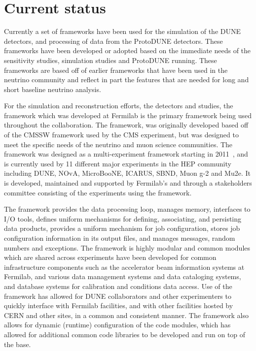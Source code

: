 \documentclass[../main-v1.tex]{subfiles}
\begin{document}
\section{Current status}\label{sec:framework:status}

Currently a set of frameworks have been used for the simulation of the DUNE detectors, and processing of data from the ProtoDUNE detectors.  These frameworks have been developed or adopted based on the immediate needs of the sensitivity studies, simulation studies and ProtoDUNE running.  These frameworks are based off of earlier frameworks that have been used in the neutrino community and reflect in part the features that are needed for long and short baseline neutrino analysis.

For the  simulation and reconstruction efforts, the  detectors and  studies, the  framework which was developed at Fermilab is the primary framework being used throughout the collaboration.  The  framework, was originally developed based off of the CMSSW framework used by the CMS experiment, but was designed to meet the specific needs of the neutrino and muon science communities.  The  framework was designed as a multi-experiment framework starting in 2011~\cite{Green:2012gv}, and is currently used by 11 different major experiments in the HEP community including DUNE, NOvA, MicroBooNE, ICARUS, SBND, Muon g-2 and Mu2e.  It is developed, maintained and supported by Fermilab's  and through a stakeholders committee consisting of the experiments using the framework.

The framework provides the data processing loop, manages memory, interfaces to I/O tools, defines uniform mechanisms for defining, associating, and persisting data products, provides a uniform mechanism for job configuration, stores job configuration information in its output files, and manages messages, random numbers and exceptions.  The framework is highly modular and common modules which are shared across experiments have been developed for common infrastructure components such as the accelerator beam information systems at Fermilab, and various data management systems and data cataloging systems, and database systems for calibration and conditions data access.  Use of the  framework has allowed for DUNE collaborators and other experimenters to quickly interface with Fermilab facilities, and with other facilities hosted by CERN and other sites, in a common and consistent manner.  The framework also allows for dynamic (runtime) configuration of the code modules, which has allowed for additional common code libraries to be developed and run on top of the  base. 
\end{document}
